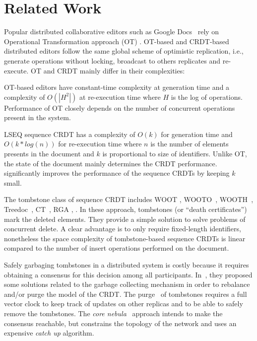 \section{Related Work}
\label{sec:relatedwork}

Popular distributed collaborative editors such as Google
Docs~\cite{nichols1995high} rely on Operational Transformation approach
(OT) \cite{sun1998operational,sun1998achieving}.  OT-based and CRDT-based
distributed editors follow the same global scheme of optimistic replication,
i.e., generate operations without locking, broadcast to others replicates and
re-execute. OT and CRDT mainly differ in their complexities:
\begin{inparaenum}[(i)]
\item OT-based editors have constant-time complexity at generation time and a
  complexity of $O(|H^{2}|)$ at re-execution time where $H$ is the log of
  operations. Performance of OT closely depends on the number of concurrent
  operations present in the system.
\item LSEQ sequence CRDT has a complexity of $O(k)$ for generation time and
  $O(k*log(n))$ for re-execution time where $n$ is the number of elements
  presents in the document and $k$ is proportional to size of
  identifiers. Unlike OT, the state of the document mainly determines the CRDT
  performance. \NAME{} significantly improves the performance of the sequence
  CRDTs by keeping $k$ small.
\end{inparaenum}

The tombstone class of sequence CRDT includes WOOT \cite{oster2006data},
WOOTO~\cite{weiss2007wooki}, WOOTH~\cite{ahmed2011evaluating},
Treedoc~\cite{preguica2009commutative}, CT~\cite{grishchenko2010deep},
RGA \cite{roh2011replicated}, \cite{Yu2012stringwise}. In these approach,
tombstones (or ``death certificates'') mark the deleted elements. They provide
a simple solution to solve problems of concurrent delete. A clear advantage is
to only require fixed-length identifiers, nonetheless the space complexity of
tombstone-based sequence CRDTs is linear compared to the number of insert
operations performed on the document.

Safely garbaging tombstones in a distributed system is costly because it
requires obtaining a consensus for this decision among all participants.
In~\cite{roh2011replicated, letia2009crdts}, they proposed some solutions
related to the garbage collecting mechanism in order to rebalance and/or purge
the model of the CRDT.  The purge~\cite{roh2011replicated} of tombstones
requires a full vector clock to keep track of updates on other replicas and to
be able to safely remove the tombstones. The \emph{core
  nebula}~\cite{letia2009crdts} approach intends to make the consensus
reachable, but constrains the topology of the network and uses an expensive
\emph{catch up} algorithm.

